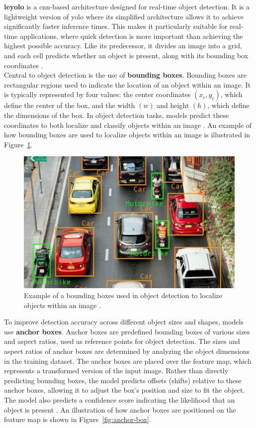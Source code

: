 \textbf{\gls{leyolo}} is a \gls{cnn}-based architecture designed for real-time object detection. It is a lightweight version of \gls{yolo} where its simplified architecture allows it to achieve significantly faster inference times. This makes it particularly suitable for real-time applications, where quick detection is more important than achieving the highest possible accuracy. Like its predecessor, it divides an image into a grid, and each cell predicts whether an object is present, along with its bounding box coordinates \cite{openreview:leyolo}.\\

Central to object detection is the use of \textbf{bounding boxes}. Bounding boxes are rectangular regions used to indicate the location of an object within an image. It is typically represented by four values: the center coordinates \((x_c, y_c)\), which define the center of the box, and the width \((w)\) and height \((h)\), which define the dimensions of the box. In object detection tasks, models predict these coordinates to both localize and classify objects within an image \cite{peopleforai:boundingbox}. An example of how bounding boxes are used to localize objects within an image is illustrated in Figure~\ref{fig:boundingbox}.

\begin{figure}[h!]
    \centering
    \includegraphics[width=0.75\linewidth]{figures/theory/image-recognition/bbox-example.png}
    \caption[Bounding box in object detection]{Example of a bounding boxes used in object detection to localize objects within an image \cite{peopleforai:boundingbox}.}
    \label{fig:boundingbox}
\end{figure}

To improve detection accuracy across different object sizes and shapes, models use \textbf{anchor boxes}. Anchor boxes are predefined bounding boxes of various sizes and aspect ratios, used as reference points for object detection. The sizes and aspect ratios of anchor boxes are determined by analyzing the object dimensions in the training dataset. The anchor boxes are placed over the feature map, which represents a transformed version of the input image. Rather than directly predicting bounding boxes, the model predicts offsets (shifts) relative to these anchor boxes, allowing it to adjust the box's position and size to fit the object. The model also predicts a confidence score indicating the likelihood that an object is present \cite{thinkautonomous:anchorboxes}. An illustration of how anchor boxes are positioned on the feature map is shown in Figure~\ref{fig:anchor-box}.

